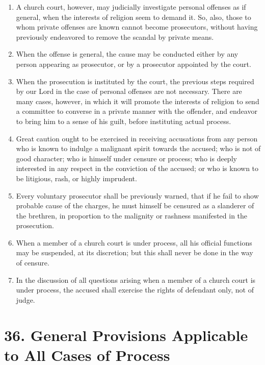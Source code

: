 \documentclass[
]{book}
\providecommand{\tightlist}{%
  \setlength{\itemsep}{0pt}\setlength{\parskip}{0pt}}
\begin{document}
\begin{enumerate}
\def\labelenumi{\arabic{enumi}.}
\setcounter{enumi}{5}
\tightlist
\item
  A church court, however, may judicially investigate personal offenses as if general, when the interests of religion seem to demand it. So, also, those to whom private offenses are known cannot become prosecutors, without having previously endeavored to remove the scandal by private means.
\item
  When the offense is general, the cause may be conducted either by any person appearing as prosecutor, or by a prosecutor appointed by the court.
\item
  When the prosecution is instituted by the court, the previous steps required by our Lord in the case of personal offenses are not necessary. There are many cases, however, in which it will promote the interests of religion to send a committee to converse in a private manner with the offender, and endeavor to bring him to a sense of his guilt, before instituting actual process.
\item
  Great caution ought to be exercised in receiving accusations from any person who is known to indulge a malignant spirit towards the accused; who is not of good character; who is himself under censure or process; who is deeply interested in any respect in the conviction of the accused; or who is known to be litigious, rash, or highly imprudent.
\item
  Every voluntary prosecutor shall be previously warned, that if he fail to show probable cause of the charges, he must himself be censured as a slanderer of the brethren, in proportion to the malignity or rashness manifested in the prosecution.
\item
  When a member of a church court is under process, all his official functions may be suspended, at its discretion; but this shall never be done in the way of censure.
\item
  In the discussion of all questions arising when a member of a church court is under process, the accused shall exercise the rights of defendant only, not of judge.
\end{enumerate}

\hypertarget{general-provisions-applicable-to-all-cases-of-process}{%
\section*{36. General Provisions Applicable to All Cases of Process}\label{general-provisions-applicable-to-all-cases-of-process}}
\end{document}
